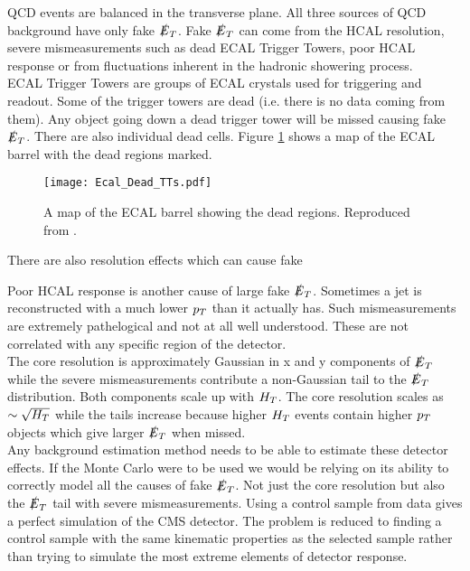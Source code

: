 QCD events are balanced in the transverse plane. All three sources of QCD 
background have only fake $\slashed{E}_{T}$. Fake $\slashed{E}_{T}$ can come from the HCAL resolution, 
severe mismeasurements such as dead ECAL Trigger Towers, poor HCAL response or 
from fluctuations inherent in the hadronic showering process. \\

ECAL Trigger Towers are groups of ECAL crystals used for triggering and readout.
Some of the trigger towers are dead (i.e. there is no data coming from them).
Any object going down a dead trigger tower will be missed causing fake $\slashed{E}_{T}$.
There are also individual dead cells. Figure \ref{fig:Dead_ECAL_TTs} shows a map 
of the ECAL barrel with the dead regions marked. \\

\begin{figure}
\begin{center}
\texttt{[image: Ecal\_Dead\_TTs.pdf]}
\end{center}
\caption{A map of the ECAL barrel showing the dead regions. Reproduced from 
\cite{spikes}.}
\label{fig:Dead_ECAL_TTs}
\end{figure}

There are also resolution effects which can cause fake

Poor HCAL response is another cause of large fake $\slashed{E}_{T}$. Sometimes a jet is
reconstructed with a much lower $p_{T}$ than it actually has. Such mismeasurements
are extremely pathelogical and not at all well understood. These are not
correlated with any specific region of the detector. \\

The core resolution is approximately Gaussian in x and y components of $\slashed{E}_{T}$ 
while the severe mismeasurements contribute a non-Gaussian tail to the $\slashed{E}_{T}$ 
distribution. Both components scale up with $H_{T}$. The core resolution scales as
$\sim\sqrt{H_{T}}$ while the tails increase because higher $H_{T}$ events contain 
higher $p_{T}$ objects which give larger $\slashed{E}_{T}$ when missed. \\

Any background estimation method needs to be able to estimate these detector 
effects. If the Monte Carlo were to be used we would be relying on its ability 
to correctly model all the causes of fake $\slashed{E}_{T}$. Not just the core resolution 
but also the $\slashed{E}_{T}$ tail with severe mismeasurements. Using a control sample 
from data gives a perfect simulation of the CMS detector. The problem is reduced
to finding a control sample with the same kinematic properties as the selected 
sample rather than trying to simulate the most extreme elements of detector
response. \\

